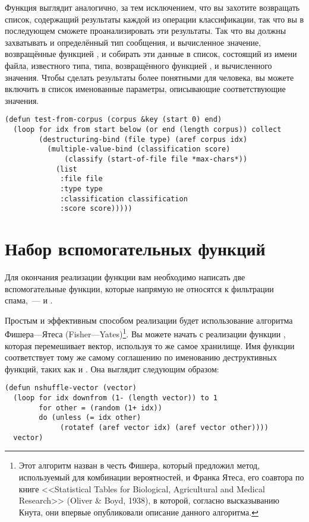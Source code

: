 Функция  выглядит аналогично, за тем исключением, что вы захотите
возвращать список, содержащий результаты каждой из операции классификации, так что вы в
последующем сможете проанализировать эти результаты.  Так что вы должны захватывать и
определённый тип сообщения, и вычисленное значение, возвращённые функцией ,
и собирать эти данные в список, состоящий из имени файла, известного типа, типа,
возвращённого функцией , и вычисленного значения.  Чтобы сделать результаты
более понятными для человека, вы можете включить в список именованные параметры,
описывающие соответствующие значения.

\begin{lstlisting}
(defun test-from-corpus (corpus &key (start 0) end)
  (loop for idx from start below (or end (length corpus)) collect
        (destructuring-bind (file type) (aref corpus idx)
          (multiple-value-bind (classification score)
              (classify (start-of-file file *max-chars*))
            (list 
             :file file
             :type type
             :classification classification
             :score score)))))
\end{lstlisting}


\section{Набор вспомогательных функций}

Для окончания реализации функции  вам необходимо написать две
вспомогательные функции, которые напрямую не относятся к фильтрации спама,~---
 и .

Простым и эффективным способом реализации  будет использование
алгоритма Фишера---Ятеса (Fisher---Yates)\footnote{Этот алгоритм назван в честь Фишера,
  который предложил метод, используемый для комбинации вероятностей, и Франка Ятеса, его
  соавтора по книге <<Statistical Tables for Biological, Agricultural and Medical
  Research>> (Oliver \& Boyd, 1938), в которой, согласно высказыванию Кнута, они впервые
  опубликовали описание данного алгоритма.}.  Вы можете начать с реализации функции
  , которая перемешивает вектор, используя то же самое хранилище.
  Имя функции соответствует тому же самому соглашению по именованию деструктивных функций,
  таких как  и .  Она выглядит следующим образом:

\begin{lstlisting}
(defun nshuffle-vector (vector)
  (loop for idx downfrom (1- (length vector)) to 1
        for other = (random (1+ idx))
        do (unless (= idx other)
             (rotatef (aref vector idx) (aref vector other))))
  vector)
\end{lstlisting}

